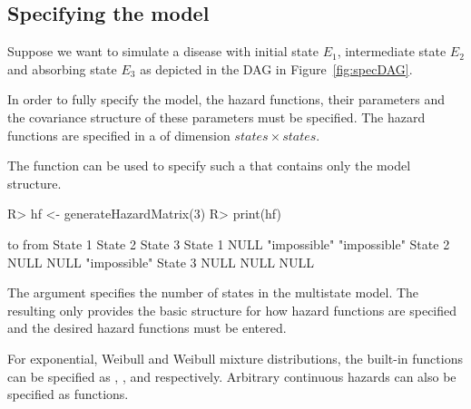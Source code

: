 \subsection[Model specification]{Specifying the model}\label{spec}

Suppose we want to simulate a disease with initial state $E_1$, intermediate state $E_2$ and absorbing state $E_3$ as depicted in the DAG in Figure~\ref{fig:specDAG}.

In order to fully specify the model, the hazard functions, their parameters and the covariance structure of these parameters must be specified. The hazard functions are specified in a  of dimension $states \times states$. 

The function  can be used to specify such a  that contains only the model structure. 
\begin{Schunk}
\begin{Sinput}
R>   hf <- generateHazardMatrix(3)
R>   print(hf)
\end{Sinput}
\begin{Soutput}
         to
from      State 1 State 2      State 3     
  State 1 NULL    "impossible" "impossible"
  State 2 NULL    NULL         "impossible"
  State 3 NULL    NULL         NULL        
\end{Soutput}
\end{Schunk}
The argument  specifies the number of states in the multistate model. The resulting  only provides the basic structure for how hazard functions are specified and the desired hazard functions must be entered. 

For exponential, Weibull and Weibull mixture distributions, the built-in functions can be specified as , , and  respectively. Arbitrary continuous hazards can also be specified as functions. 

